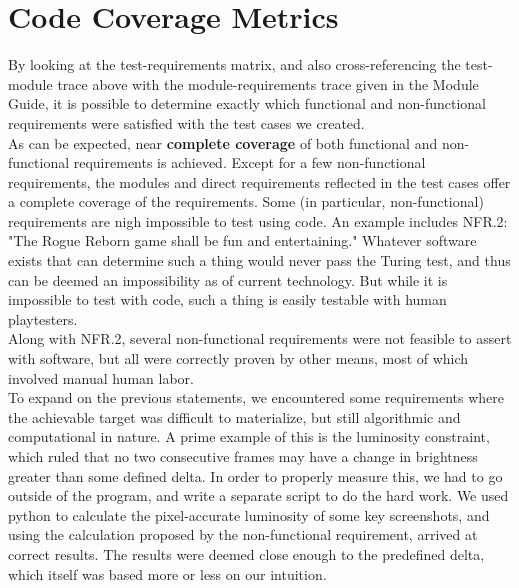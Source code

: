 \documentclass[12pt, titlepage]{article}
\newcommand{\newsection}[1]{
  \newpage
  \section{#1}
}
\begin{document}
\newsection{Code Coverage Metrics} \label{Section_Metrics}
	By looking at the test-requirements matrix, and also cross-referencing the test-module trace above with the module-requirements trace given in the Module Guide, it is possible to determine exactly which functional and non-functional requirements were satisfied with the test cases we created.\\

	As can be expected, near \textbf{complete coverage} of both functional and non-functional requirements is achieved. Except for a few non-functional requirements, the modules and direct requirements reflected in the test cases offer a complete coverage of the requirements. Some (in particular, non-functional) requirements are nigh impossible to test using code. An example includes NFR.2: "The Rogue Reborn game shall be fun and entertaining." Whatever software exists that can determine such a thing would never pass the Turing test, and thus can be deemed an impossibility as of current technology. But while it is impossible to test with code, such a thing is easily testable with human playtesters.\\

	Along with NFR.2, several non-functional requirements were not feasible to assert with software, but all were correctly proven by other means, most of which involved manual human labor.\\

	To expand on the previous statements, we encountered some requirements where the achievable target was difficult to materialize, but still algorithmic and computational in nature. A prime example of this is the luminosity constraint, which ruled that no two consecutive frames may have a change in brightness greater than some defined delta. In order to properly measure this, we had to go outside of the program, and write a separate script to do the hard work. We used python to calculate the pixel-accurate luminosity of some key screenshots, and using the calculation proposed by the non-functional requirement, arrived at correct results. The results were deemed close enough to the predefined delta, which itself was based more or less on our intuition.

%

%
\end{document}
